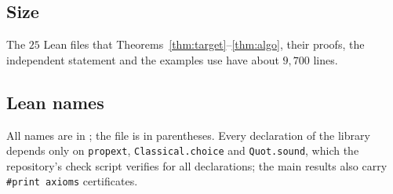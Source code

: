 \documentclass[runningheads,11pt]{llncs}
\begin{document}
\subsection{Size}

The $25$ Lean files that Theorems~\ref{thm:target}--\ref{thm:algo}, their proofs, the independent statement and the examples use have about $9{,}700$ lines.

\subsection{Lean names}\label{app:lean}

All names are in ; the file is in parentheses. Every declaration of the library depends only on \texttt{propext}, \texttt{Classical.choice} and \texttt{Quot.sound}, which the repository's check script verifies for all declarations; the main results also carry \verb|#print axioms| certificates.
\end{document}
